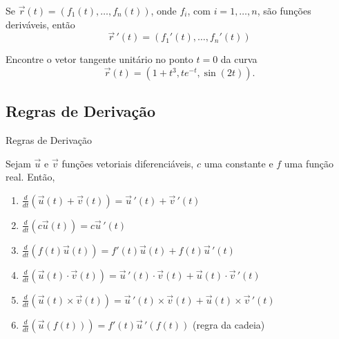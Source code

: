 \begin{frame}[label=fun-vet]
\begin{prop}
Se $\vec{r}(t)=\left(f_1(t),\ldots,f_n(t)\right)$, onde $f_i$, com $i=1,\ldots,n$, são funções deriváveis, então
\[\vec{r}\,'(t)=\left(f_1'(t),\ldots,f_n'(t)\right)\]
\end{prop}

\begin{exe}
Encontre o vetor tangente unitário no ponto $t=0$ da curva 
\[\vec{r}(t)=\left(1+t^3,te^{-t},\sin(2t)\right).\]
\end{exe}
\end{frame}

\subsection*{Regras de Derivação}
\begin{frame}[label=fun-vet]{Regras de Derivação}
\begin{prop}
Sejam $\vec{u}$ e $\vec{v}$ funções vetoriais diferenciáveis, $c$ uma constante e $f$ uma função real. Então,
\begin{enumerate}
\item $\frac{d}{dt}\left(\vec{u}(t)+\vec{v}(t)\right)= \vec{u}\,'(t)+\vec{v}\,'(t)$
\item $\frac{d}{dt}\left(c\vec{u}(t)\right)= c\vec{u}\,'(t)$
\item $\frac{d}{dt}\left(f(t)\vec{u}(t)\right)= f'(t)\vec{u}(t)+f(t)\vec{u}\,'(t)$
\item $\frac{d}{dt}\left(\vec{u}(t)\cdot \vec{v}(t)\right)= \vec{u}\,'(t)\cdot\vec{v}(t)+\vec{u}(t)\cdot\vec{v}\,'(t)$
\item $\frac{d}{dt}\left(\vec{u}(t)\times \vec{v}(t)\right)= \vec{u}\,'(t)\times\vec{v}(t)+\vec{u}(t)\times\vec{v}\,'(t)$
\item $\frac{d}{dt}\left(\vec{u}(f(t))\right)= f'(t)\vec{u}\,'(f(t))$ (regra da cadeia)
\end{enumerate}
\end{prop}


\end{frame}


